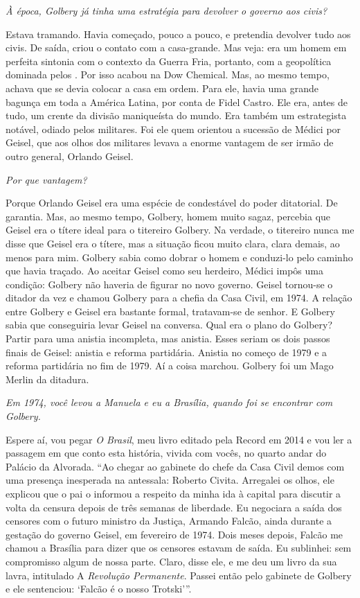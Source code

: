 \itshape
 À época, Golbery já tinha uma estratégia para devolver
o governo aos civis?

\normalfont
Estava tramando. Havia começado, pouco a pouco, e
pretendia devolver tudo aos civis. De saída, criou o contato com a
casa-grande. Mas veja: era um homem em perfeita sintonia com o contexto
da Guerra Fria, portanto, com a geopolítica dominada pelos . Por isso
acabou na Dow Chemical. Mas, ao mesmo tempo, achava que se devia colocar
a casa em ordem. Para ele, havia uma grande bagunça em toda a América
Latina, por conta de Fidel Castro. Ele era, antes de tudo, um crente da
divisão maniqueísta do mundo. Era também um estrategista notável, odiado
pelos militares. Foi ele quem orientou a sucessão de Médici por Geisel,
que aos olhos dos militares levava a enorme vantagem de ser irmão de
outro general, Orlando Geisel.

\itshape
 Por que vantagem?

\normalfont
Porque Orlando Geisel era uma espécie de condestável do
poder ditatorial. De garantia. Mas, ao mesmo tempo, Golbery, homem muito
sagaz, percebia que Geisel era o títere ideal para o titereiro Golbery.
Na verdade, o titereiro nunca me disse que Geisel era o títere, mas a
situação ficou muito clara, clara demais, ao menos para mim. Golbery
sabia como dobrar o homem e conduzi-lo pelo caminho que havia traçado.
Ao aceitar Geisel como seu herdeiro, Médici impôs uma condição: Golbery
não haveria de figurar no novo governo. Geisel tornou-se o ditador da
vez e chamou Golbery para a chefia da Casa Civil, em 1974. A relação
entre Golbery e Geisel era bastante formal, tratavam-se de senhor. E
Golbery sabia que conseguiria levar Geisel na conversa. Qual era o plano
do Golbery? Partir para uma anistia incompleta, mas anistia. Esses
seriam os dois passos finais de Geisel: anistia e reforma partidária.
Anistia no começo de 1979 e a reforma partidária no fim de 1979. Aí a
coisa marchou. Golbery foi um Mago Merlin da ditadura.

\itshape
 Em 1974, você levou a Manuela e eu a Brasília, quando
foi se encontrar com Golbery.

\normalfont
Espere aí, vou pegar \emph{O Brasil}, meu livro editado
pela Record em 2014 e vou ler a passagem em que conto esta história,
vivida com vocês, no quarto andar do Palácio da Alvorada. ``Ao chegar ao
gabinete do chefe da Casa Civil demos com uma presença inesperada na
antessala: Roberto Civita. Arregalei os olhos, ele explicou que o pai o
informou a respeito da minha ida à capital para discutir a volta da
censura depois de três semanas de liberdade. Eu negociara a saída dos
censores com o futuro ministro da Justiça, Armando Falcão, ainda durante
a gestação do governo Geisel, em fevereiro de 1974. Dois meses depois,
Falcão me chamou a Brasília para dizer que os censores estavam de saída.
Eu sublinhei: sem compromisso algum de nossa parte. Claro, disse ele, e
me deu um livro da sua lavra, intitulado A \emph{Revolução Permanente}.
Passei então pelo gabinete de Golbery e ele sentenciou: `Falcão é o
nosso Trotski'''.

